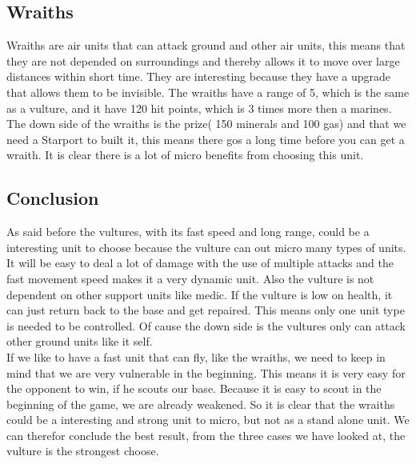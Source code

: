 \subsection{Wraiths}
Wraiths are air units that can attack ground and other air units, this means that they are not depended on surroundings and thereby allows it
to move over large distances within short time. They are interesting because they have a upgrade that allows them to be invisible. The wraiths 
have a range of 5, which is the same as a vulture, and it have 120 hit points, which is 3 times more then a marines.
The down side of the wraiths is the prize( 150 minerals and 100 gas) and that we need a Starport to built it, this means
there gos a long time before you can get a wraith. It is clear there is a lot of micro benefits from choosing this unit. 


\subsection{Conclusion}
As said before the vultures, with its fast speed and long range, could be a interesting unit to choose because the vulture can out micro many types of
units. It will be easy to deal a lot of damage with the use of multiple attacks and the fast movement speed makes it a very dynamic unit. Also the vulture
is not dependent on other support units like medic. If the vulture is low on health, it can just return back to the base and get repaired. This means
only one unit type is needed to be controlled. Of cause the down side is the vultures only can attack other ground units like it self.\\
If we like to have a fast unit that can fly, like the wraiths, we need to keep in mind that we are very vulnerable in the beginning. This means it is very
easy for the opponent to win, if he scouts our base. Because it is easy to scout in the beginning of the game, we are already weakened. So it is clear that
the wraiths could be a interesting and strong unit to micro, but not as a stand alone unit. We can therefor conclude the best result, from the three cases
we have looked at, the vulture is the strongest choose.